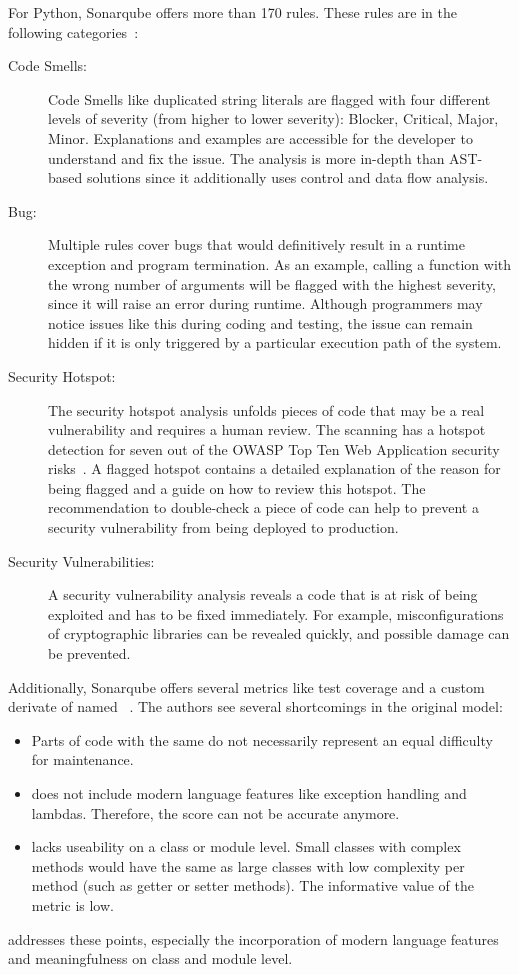 For Python, Sonarqube offers more than 170 rules. These rules are in the following categories~\cite{noauthor_python_nodate}:
\begin{description}
    \item[Code Smells:] Code Smells like duplicated string literals are flagged with four different levels of severity (from higher to lower severity): Blocker, Critical, Major, Minor. Explanations and examples are accessible for the developer to understand and fix the issue. The analysis is more in-depth than AST-based solutions since it additionally uses control and data flow analysis.
    \item[Bug:] Multiple rules cover bugs that would definitively result in a runtime exception and program termination. As an example, calling a function with the wrong number of arguments will be flagged with the highest severity, since it will raise an error during runtime. Although programmers may notice issues like this during coding and testing, the issue can remain hidden if it is only triggered by a particular execution path of the system.
     \item[Security Hotspot:] The security hotspot analysis unfolds pieces of code that may be a real vulnerability and requires a human review. The scanning has a hotspot detection for seven out of the OWASP Top Ten Web Application security risks~\cite{noauthor_python_nodate}. A flagged hotspot contains a detailed explanation of the reason for being flagged and a guide on how to review this hotspot. The recommendation to double-check a piece of code can help to prevent a security vulnerability from being deployed to production.
    \item[Security Vulnerabilities:]  A security vulnerability analysis reveals a code that is at risk of being exploited and has to be fixed immediately. For example, misconfigurations of cryptographic libraries can be revealed quickly, and possible damage can be prevented.   
\end{description}

Additionally, Sonarqube offers several metrics like test coverage and a custom derivate of  named ~\cite{campbell2018cognitive}. The authors see several shortcomings in the original  model:
\begin{itemize}
    \item Parts of code with the same  do not necessarily represent an equal difficulty for maintenance.
    \item  {} does not include modern language features like exception handling and lambdas. Therefore, the score can not be accurate anymore.
    \item {} lacks useability on a class or module level. Small classes with complex methods would have the same  as large classes with low complexity per method (such as getter or setter methods). The informative value of the metric is low.
\end{itemize}
 addresses these points, especially the incorporation of modern language features and meaningfulness on class and module level.

